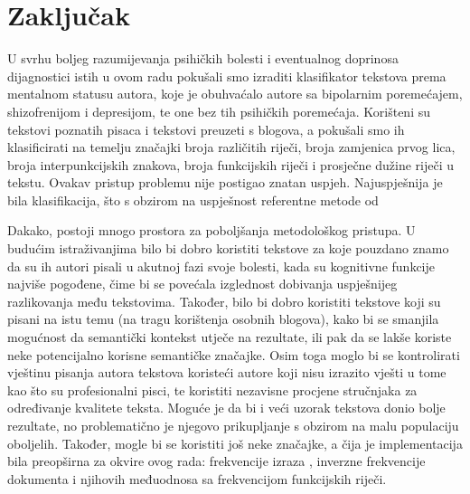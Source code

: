 \documentclass[10pt, a4paper]{article}
\begin{document}
\section{Zaključak}

U svrhu boljeg razumijevanja psihičkih bolesti i eventualnog doprinosa dijagnostici istih u ovom radu pokušali smo izraditi klasifikator tekstova prema mentalnom statusu autora, koje je obuhvaćalo autore sa bipolarnim poremećajem, shizofrenijom i depresijom, te one bez tih psihičkih poremećaja. Korišteni su tekstovi poznatih pisaca i tekstovi preuzeti s blogova, a pokušali smo ih klasificirati na temelju značajki broja različitih riječi, broja zamjenica prvog lica, broja interpunkcijskih znakova, broja funkcijskih riječi i prosječne dužine riječi u tekstu. 
Ovakav pristup problemu nije postigao znatan uspjeh. Najuspješnija je bila klasifikacija, što s obzirom na uspješnost referentne metode od %

Dakako, postoji mnogo prostora za poboljšanja metodološkog pristupa. U budućim istraživanjima bilo bi dobro koristiti tekstove za koje pouzdano znamo da su ih autori pisali u akutnoj fazi svoje bolesti, kada su kognitivne funkcije najviše pogođene, čime bi se povećala izglednost dobivanja uspješnijeg razlikovanja među tekstovima. Također, bilo bi dobro koristiti tekstove koji su pisani na istu temu (na tragu korištenja osobnih blogova), kako bi se smanjila mogućnost da semantički kontekst utječe na rezultate, ili pak da se lakše koriste neke potencijalno korisne semantičke značajke. Osim toga moglo bi se kontrolirati vještinu pisanja autora tekstova koristeći autore koji nisu izrazito vješti u tome kao što su profesionalni pisci, te koristiti nezavisne procjene stručnjaka za određivanje kvalitete teksta. Moguće je da bi i veći uzorak tekstova donio bolje rezultate, no problematično je njegovo prikupljanje s obzirom na malu populaciju oboljelih. Također, mogle bi se koristiti još neke značajke, a čija je implementacija bila preopširna za okvire ovog rada: frekvencije izraza , inverzne frekvencije dokumenta  i njihovih međuodnosa sa frekvencijom funkcijskih riječi.


 
\end{document}
